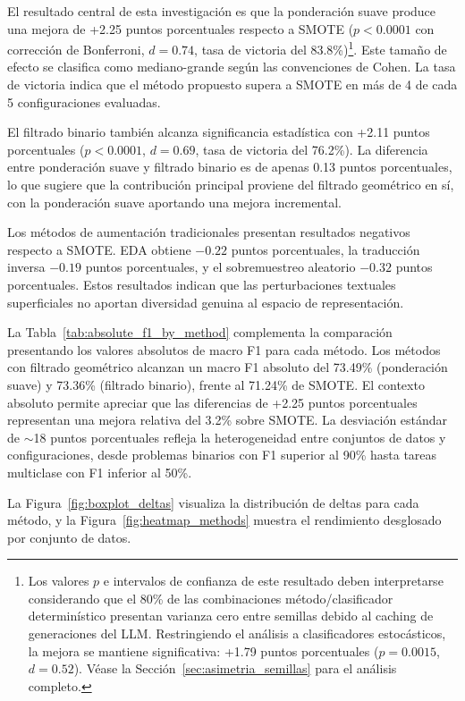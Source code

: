 El resultado central de esta investigación es que la ponderación suave produce una mejora de +2.25 puntos porcentuales respecto a SMOTE ($p < 0.0001$ con corrección de Bonferroni, $d = 0.74$, tasa de victoria del 83.8\%)\footnote{Los valores $p$ e intervalos de confianza de este resultado deben interpretarse considerando que el 80\% de las combinaciones método/clasificador determinístico presentan varianza cero entre semillas debido al caching de generaciones del LLM. Restringiendo el análisis a clasificadores estocásticos, la mejora se mantiene significativa: +1.79 puntos porcentuales ($p = 0.0015$, $d = 0.52$). Véase la Sección~\ref{sec:asimetria_semillas} para el análisis completo.}. Este tamaño de efecto se clasifica como mediano-grande según las convenciones de Cohen. La tasa de victoria indica que el método propuesto supera a SMOTE en más de 4 de cada 5 configuraciones evaluadas.

El filtrado binario también alcanza significancia estadística con +2.11 puntos porcentuales ($p < 0.0001$, $d = 0.69$, tasa de victoria del 76.2\%). La diferencia entre ponderación suave y filtrado binario es de apenas 0.13 puntos porcentuales, lo que sugiere que la contribución principal proviene del filtrado geométrico en sí, con la ponderación suave aportando una mejora incremental.

Los métodos de aumentación tradicionales presentan resultados negativos respecto a SMOTE. EDA obtiene $-0.22$ puntos porcentuales, la traducción inversa $-0.19$ puntos porcentuales, y el sobremuestreo aleatorio $-0.32$ puntos porcentuales. Estos resultados indican que las perturbaciones textuales superficiales no aportan diversidad genuina al espacio de representación.

La Tabla~\ref{tab:absolute_f1_by_method} complementa la comparación presentando los valores absolutos de macro F1 para cada método. Los métodos con filtrado geométrico alcanzan un macro F1 absoluto del 73.49\% (ponderación suave) y 73.36\% (filtrado binario), frente al 71.24\% de SMOTE. El contexto absoluto permite apreciar que las diferencias de +2.25 puntos porcentuales representan una mejora relativa del 3.2\% sobre SMOTE. La desviación estándar de $\sim$18 puntos porcentuales refleja la heterogeneidad entre conjuntos de datos y configuraciones, desde problemas binarios con F1 superior al 90\% hasta tareas multiclase con F1 inferior al 50\%.



La Figura~\ref{fig:boxplot_deltas} visualiza la distribución de deltas para cada método, y la Figura~\ref{fig:heatmap_methods} muestra el rendimiento desglosado por conjunto de datos.

